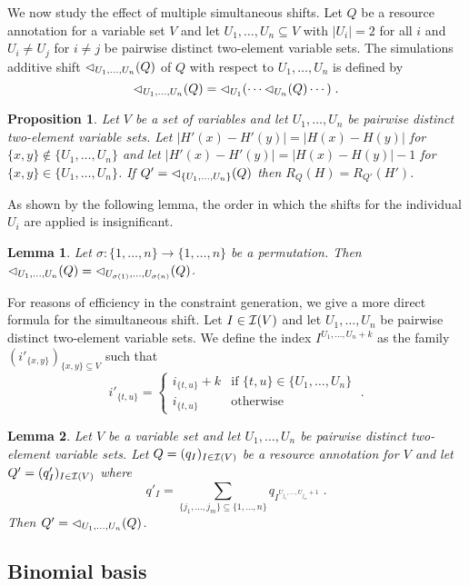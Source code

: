 \documentclass[nocopyrightspace,preprint]{sigplanconf-pldi15}
\newtheorem{lemma}{Lemma}
\newtheorem{proposition}{Proposition}
\begin{document}
We now study the effect of multiple simultaneous shifts.  Let $Q$ be a
resource annotation for a variable set $V$ and let $U_1,\ldots,U_n
\subseteq V$ with $|U_i| = 2$ for all $i$ and $U_i \neq U_j$ for $i
\neq j$ be pairwise distinct two-element variable sets.  The
simulations additive shift ${\lhd}_{U_1,\ldots,U_n}(Q)$ of $Q$ with
respect to $U_1,\ldots,U_n$ is defined by
$$
{\lhd}_{U_1,\ldots,U_n}(Q) = {\lhd}_{U_1}( \cdots {\lhd}_{U_n}(Q) \cdots ) \; .
$$
%
\begin{proposition}
  Let $V$ be a set of variables and let $U_1,\ldots,U_n$ be pairwise
  distinct two-element variable sets.  Let $|H'(x) {-} H'(y)| = |H(x)
  {-} H(y)|$ for $\{x,y\} \not\in \{U_1,\ldots,U_n\}$ and let $|H'(x)
  {-} H'(y)| = |H(x) {-} H(y)| - 1$ for $\{x,y\} \in
  \{U_1,\ldots,U_n\}$.
  If $Q' = {\lhd}_{\{U_1,\ldots,U_n\}}(Q)$ then $R_Q(H) = R_{Q'}(H')$.
\end{proposition}
%
As shown by the following lemma, the order in which the shifts for the
individual $U_i$ are applied is insignificant.
%
\begin{lemma}
  Let $\sigma : \{1,\ldots,n\} \to \{1,\ldots,n\}$ be a
  permutation. Then ${\lhd}_{U_1,\ldots,U_n}(Q) =
  {\lhd}_{U_{\sigma(1)},\ldots,U_{\sigma(n)}}(Q)$.
\end{lemma}
%
For reasons of efficiency in the constraint generation, we give a more
direct formula for the simultaneous shift.  Let $I \in \mathcal{I}(V)$ and
let $U_1,\ldots,U_n$ be pairwise distinct two-element variable sets.
We define the index $I^{U_1,\ldots,U_n + k}$ as the family $(i'_{\{x,y\}})_{\{x,y\} \subseteq V}$ such that
$$
i'_{\{t,u\}} = \left\{
  \begin{array}{ll}
    i_{\{t,u\}} + k  & \text{if } \{t,u\} \in \{U_1,\ldots,U_n\} \\
    i_{\{t,u\}} & \text{otherwise}
  \end{array}
\right.  \;.
$$

%
\begin{lemma}
  Let $V$ be a variable set and let $U_1,\ldots,U_n$ be pairwise
  distinct two-element variable sets.
  Let $Q = (q_I)_{I \in \mathcal{I}(V)}$ be a resource annotation for
  $V$ and let $ Q' = (q'_I)_{I \in \mathcal{I}(V)}$ where
  $$
  q'_I = \sum_{\{j_1,\ldots,j_m\} \subseteq \{1,\ldots,n\} } q_{I^{U_{j_1},\ldots,U_{j_m}+1}} \; .
  $$
  Then $Q' = {\lhd}_{U_1,\ldots,U_n}(Q)$.
\end{lemma}

\subsection{Binomial basis}
\end{document}
